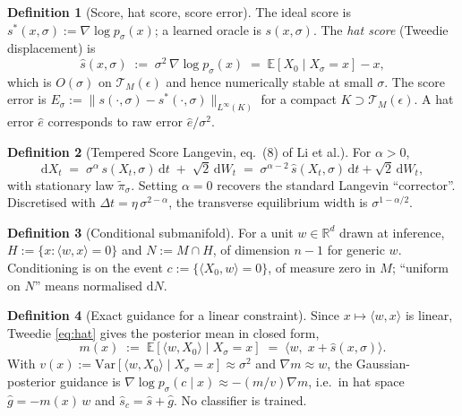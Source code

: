 \documentclass[10pt]{article}
\theoremstyle{definition}
\newtheorem{definition}{Definition}
\theoremstyle{plain}
\newcommand{\shat}{\hat{s}}
\newcommand{\R}{\mathbb{R}}
\newcommand{\E}{\mathbb{E}}
\newcommand{\TM}{\mathcal{T}_M}
\begin{document}
\begin{definition}[Score, hat score, score error]
The ideal score is $s^*(x,\sigma) := \nabla \log p_\sigma(x)$; a learned oracle
is $s(x,\sigma)$. The \emph{hat score} (Tweedie displacement) is
\begin{equation}
\shat(x,\sigma) \;:=\; \sigma^2\, \nabla \log p_\sigma(x)
   \;=\; \E[X_0 \mid X_\sigma = x] - x ,
\label{eq:hat}
\end{equation}
which is $O(\sigma)$ on $\TM(\epsilon)$ and hence numerically stable at small
$\sigma$. The score error is
$E_\sigma := \|s(\cdot,\sigma) - s^*(\cdot,\sigma)\|_{L^\infty(K)}$ for a compact
$K \supset \TM(\epsilon)$. A hat error $\hat{e}$ corresponds to raw error
$\hat{e}/\sigma^2$.
\end{definition}

\begin{definition}[Tempered Score Langevin, eq.~(8) of Li et al.]
For $\alpha > 0$,
\begin{equation}
\mathrm{d}X_t \;=\; \sigma^{\alpha}\, s(X_t,\sigma)\, \mathrm{d}t
   \;+\; \sqrt{2}\, \mathrm{d}W_t
   \;=\; \sigma^{\alpha-2}\, \shat(X_t,\sigma)\, \mathrm{d}t + \sqrt2\, \mathrm{d}W_t ,
\label{eq:ts}
\end{equation}
with stationary law $\tilde\pi_\sigma$. Setting $\alpha=0$ recovers the standard
Langevin ``corrector''. Discretised with $\Delta t = \eta\,\sigma^{2-\alpha}$,
the transverse equilibrium width is $\sigma^{1-\alpha/2}$.
\end{definition}

\begin{definition}[Conditional submanifold]
For a unit $w \in \R^d$ drawn at inference, $H := \{x : \langle w,x\rangle = 0\}$
and $N := M \cap H$, of dimension $n-1$ for generic $w$. Conditioning is on the
event $c := \{\langle X_0, w\rangle = 0\}$, of measure zero in $M$; ``uniform on
$N$'' means normalised $\mathrm{d}N$.
\end{definition}

\begin{definition}[Exact guidance for a linear constraint]
Since $x \mapsto \langle w,x\rangle$ is linear, Tweedie \eqref{eq:hat} gives the
posterior mean in closed form,
\begin{equation}
m(x) \;:=\; \E\!\left[\langle w, X_0\rangle \mid X_\sigma = x\right]
   \;=\; \big\langle w,\; x + \shat(x,\sigma) \big\rangle .
\label{eq:mean}
\end{equation}
With $v(x) := \mathrm{Var}[\langle w,X_0\rangle \mid X_\sigma=x] \approx \sigma^2$
and $\nabla m \approx w$, the Gaussian-posterior guidance is
$\nabla \log p_\sigma(c\mid x) \approx -(m/v)\nabla m$, i.e.\ in hat space
$\hat{g} = -m(x)\,w$ and $\shat_c = \shat + \hat{g}$. No classifier is trained.
\end{definition}
\end{document}
